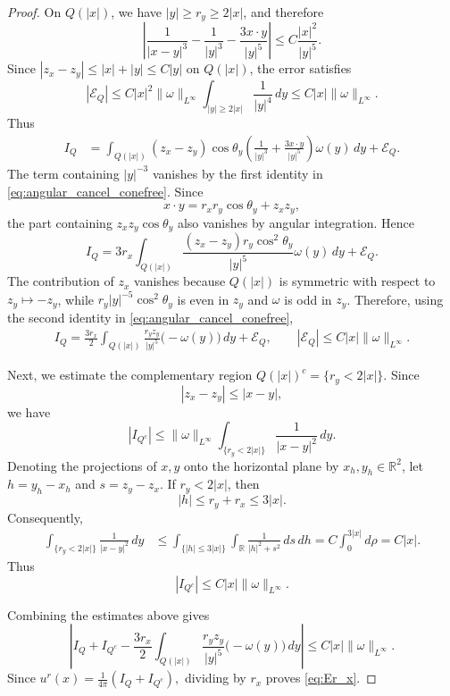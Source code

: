 \documentclass[reqno,11pt]{amsart}
\begin{document}
\begin{proof}
On \(Q(|x|)\), we have \(|y|\ge r_y\ge 2|x|\), and therefore
\[
    \left|
    \frac{1}{|x-y|^3}
    -
    \frac{1}{|y|^3}
    -
    \frac{3x\cdot y}{|y|^5}
    \right|
    \le
    C\frac{|x|^2}{|y|^5}.
\]
Since \(|z_x-z_y|\le |x|+|y|\le C|y|\) on \(Q(|x|)\), the error
satisfies
\[
    |\mathcal{E}_{Q}|
    \le C|x|^2\|\omega\|_{L^\infty}
    \int_{|y|\ge 2|x|}\frac{1}{|y|^4}\,dy
    \le
    C|x|\|\omega\|_{L^\infty}.
\]
Thus
\[
\begin{aligned}
    I_{Q}
    &=
    \int_{Q(|x|)}
    (z_x-z_y)\cos\theta_y
    \left(
    \frac1{|y|^3}
    +
    \frac{3x\cdot y}{|y|^5}
    \right)\omega(y) \,dy
    +\mathcal{E}_{Q}.
\end{aligned}
\]
The term containing \(|y|^{-3}\) vanishes by the first identity in
\eqref{eq:angular_cancel_conefree}. Since
\[
    x\cdot y=r_xr_y\cos\theta_y+z_xz_y,
\]
the part containing \(z_xz_y\cos\theta_y\) also vanishes by angular integration.
Hence
\[
    I_{Q}
    =
    3r_x
    \int_{Q(|x|)}
    \frac{(z_x-z_y)r_y\cos^2\theta_y}{|y|^5}
    \omega(y) \,dy
    +\mathcal{E}_{Q}.
\]
The contribution of \(z_x\) vanishes because \(Q(|x|)\) is symmetric
with respect to \(z_y\mapsto -z_y\), while
\(r_y|y|^{-5}\cos^2\theta_y\) is even in \(z_y\) and \(\omega\) is odd in \(z_y\).
Therefore, using the second identity in \eqref{eq:angular_cancel_conefree},
\begin{align}
\label{eq:radial_far_error_conefree}
    I_{Q}
    =
    \frac{3r_x}{2}
    \int_{Q(|x|)}
    \frac{r_yz_y}{|y|^5} \big(-\omega(y)\big) \,dy
    +\mathcal{E}_{Q},
\qquad
    |\mathcal{E}_{Q}|
    \le
    C|x|\|\omega\|_{L^\infty}.
\end{align}



Next, we estimate the complementary region \(Q(|x|)^c=\{r_y<2|x|\}\). Since
\[
    |z_x-z_y|\le |x-y|,
\]
we have
\[
    |I_{Q^c}|
    \le
    \|\omega\|_{L^\infty}
    \int_{\{r_y<2|x|\}}\frac{1}{|x-y|^2}\,dy.
\]
Denoting the projections of $x,y$ onto the horizontal plane by $x_h, y_h\in \mathbb{R}^2$,
let \(h=y_h-x_h\) and \(s=z_y-z_x\). If \(r_y<2|x|\), then
\[
    |h|\le r_y+r_x\le 3|x|.
\]
Consequently,
\[
\begin{aligned}
    \int_{\{r_y<2|x|\}}\frac{1}{|x-y|^2}\,dy
    &\le
    \int_{\{|h|\le 3|x|\}}\int_{\mathbb R}
    \frac{1}{|h|^2+s^2}\,ds\,dh
    =
    C\int_0^{3|x|}d\rho=C|x|.
\end{aligned}
\]
Thus
\[
    |I_{Q^c}|
    \le
    C|x|\|\omega\|_{L^\infty}.
\]

Combining the estimates above gives
\[
    \left|
    I_{Q}+I_{Q^c}
    -
    \frac{3r_x}{2}
    \int_{Q(|x|)}
    \frac{r_yz_y}{|y|^5}\big( -\omega(y) \big)\,dy
    \right|
    \le
    C|x|\|\omega\|_{L^\infty}.
\]
Since $u^r(x)=\frac{1}{4\pi}
    (I_{Q}+I_{Q^c}),$
dividing by \(r_x\) proves \eqref{eq:Er_x}.


\end{proof}
\end{document}
